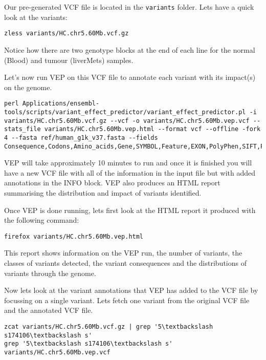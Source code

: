 \begin{steps}
Our pre-generated VCF file is located in the \texttt{variants} folder. Lets have a quick look at the variants:
\begin{lstlisting}
zless variants/HC.chr5.60Mb.vcf.gz
\end{lstlisting}
\end{steps}

Notice how there are two genotype blocks at the end of each line for the normal (Blood) and tumour (liverMets) samples.

Let's now run VEP on this VCF file to annotate each variant with its impact(s) on the genome.

\begin{steps}
\begin{lstlisting}
perl Applications/ensembl-tools/scripts/variant_effect_predictor/variant_effect_predictor.pl -i variants/HC.chr5.60Mb.vcf.gz --vcf -o variants/HC.chr5.60Mb.vep.vcf --stats_file variants/HC.chr5.60Mb.vep.html --format vcf --offline -fork 4 --fasta ref/human_g1k_v37.fasta --fields Consequence,Codons,Amino_acids,Gene,SYMBOL,Feature,EXON,PolyPhen,SIFT,Protein_position,BIOTYPE
\end{lstlisting}
\end{steps}

VEP will take approximately 10 minutes to run and once it is finished you will have a new VCF file with all of the information in the input file but with added annotations in the INFO block. VEP also produces an HTML report summarising the distribution and impact of variants identified.

\begin{steps}
Once VEP is done running, lets first look at the HTML report it produced with the following command:
\begin{lstlisting}
firefox variants/HC.chr5.60Mb.vep.html
\end{lstlisting}
\end{steps}

This report shows information on the VEP run, the number of variants, the classes of variants detected, the variant consequences and the distributions of variants through the genome.

\begin{steps}
Now lets look at the variant annotations that VEP has added to the VCF file by focussing on a single variant. Lets fetch one variant from the original VCF file and the annotated VCF file.
\begin{lstlisting}
zcat variants/HC.chr5.60Mb.vcf.gz | grep '5\textbackslash s174106\textbackslash s'
grep '5\textbackslash s174106\textbackslash s' variants/HC.chr5.60Mb.vep.vcf
\end{lstlisting}
\end{steps}

